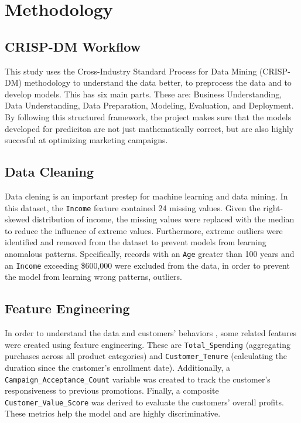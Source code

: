 \documentclass[conference]{IEEEtran}
\begin{document}
\section{Methodology}
\label{sec:methodology}

\subsection{CRISP-DM Workflow}
This study uses the Cross-Industry Standard Process for Data Mining (CRISP-DM) methodology to understand the data better, to preprocess the data and to develop models.
This has six main parts. These are: Business Understanding, Data Understanding, Data Preparation, Modeling, Evaluation, and Deployment.
By following this structured framework, the project makes sure that the  models developed for prediciton  are not just mathematically correct, but are also highly succesful at optimizing marketing campaigns.


\subsection{Data Cleaning}
Data clening is an important prestep for machine learning and data mining. 
In this dataset, the \texttt{Income} feature contained 24 missing values. 
Given the right-skewed distribution of income, the missing values were replaced with the median to reduce the influence of extreme values. 
Furthermore, extreme outliers were identified and removed from the dataset to prevent models from learning anomalous patterns. 
Specifically, records with an \texttt{Age} greater than 100 years and an \texttt{Income} exceeding \$600,000 were excluded from the data, in order to prevent the model from learning wrong patterns, outliers.


\subsection{Feature Engineering}
In order to understand the data and customers' behaviors , some related features were created using feature engineering. 
These are \texttt{Total\_Spending} (aggregating purchases across all product categories) and \texttt{Customer\_Tenure} (calculating the duration since the customer's enrollment date). 
Additionally, a \texttt{Campaign\_Acceptance\_Count} variable was created to track the customer's responsiveness to previous promotions. 
Finally, a composite \texttt{Customer\_Value\_Score} was derived to  evaluate  the customers' overall profits. These metrics help the model and are highly discriminative.
\end{document}
